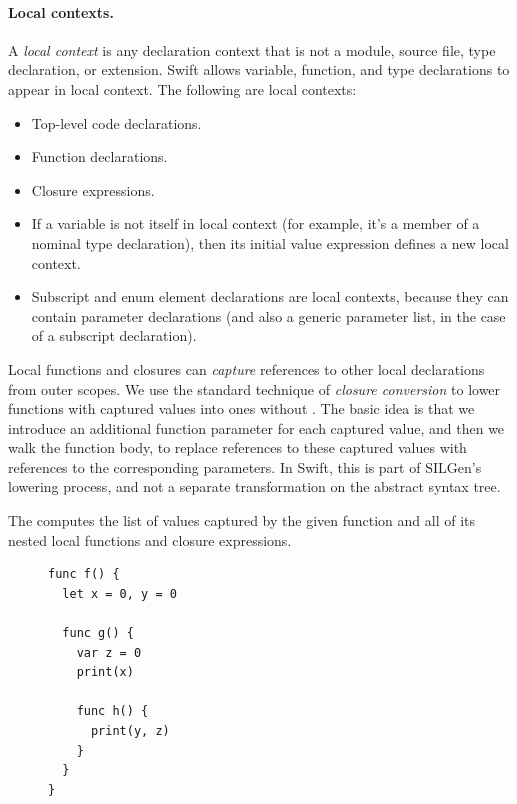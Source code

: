 \documentclass[../generics]{subfiles}
\begin{document}
\paragraph{Local contexts.}
A \emph{local context} is any declaration context that is not a module, source file, type declaration, or extension. Swift allows variable, function, and type declarations to appear in local context. The following are local contexts:
\begin{itemize}
\item {}Top-level code declarations.
\item Function declarations.
\item {}Closure expressions.
\item If a variable is not itself in local context (for example, it's a member of a nominal type declaration), then its initial value expression defines a new local context.
\item {}Subscript and enum element declarations are local contexts, because they can contain parameter declarations (and also a generic parameter list, in the case of a subscript declaration).
\end{itemize}

Local functions and closures can \emph{capture} references to other local declarations from outer scopes. We use the standard technique of \emph{closure conversion} to lower functions with captured values into ones without \cite{appel}. The basic idea is that we introduce an additional function parameter for each captured value, and then we walk the function body, to replace references to these captured values with references to the corresponding parameters. In Swift, this is part of SILGen's lowering process, and not a separate transformation on the abstract syntax tree.

The  computes the list of values captured by the given function and all of its nested local functions and closure expressions.

\begin{figure}
  \begin{minipage}{10.5em}
\begin{Verbatim}
func f() {
  let x = 0, y = 0

  func g() {
    var z = 0
    print(x)

    func h() {
      print(y, z)
    }
  }
}
\end{Verbatim}
\end{minipage}
\end{figure}
\end{document}
